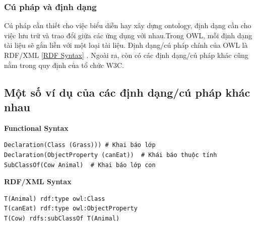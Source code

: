 \subsubsection{Cú pháp và định dạng}
Cú pháp cần thiết cho việc biểu diễn hay xây dựng ontology, định dạng cần cho việc lưu trữ và trao đổi giữa các ứng dụng với nhau.Trong OWL, mỗi định dạng tài liệu sẽ gắn liền với một loại tài liệu. Định dạng/cú pháp chính của OWL là RDF/XML [\href{http://www.w3.org/TR/owl2-overview/#ref-rdf-syntax}{RDF Syntax}] \cite{rdfxml}. Ngoài ra, còn có các định dạng/cú pháp khác cũng nằm trong quy định của tổ chức W3C.
\subsection{Một số ví dụ của các định dạng/cú pháp khác nhau}

\textbf{Functional Syntax}
\begin{verbatim}
Declaration(Class (Grass))) # Khai báo lớp
Declaration(ObjectProperty (canEat))  # Khái báo thuộc tính
SubClassOf(Cow Animal)  # Khai báo lớp con
\end{verbatim}

\textbf{RDF/XML Syntax}
\begin{verbatim}
T(Animal) rdf:type owl:Class
T(canEat) rdf:type owl:ObjectProperty
T(Cow) rdfs:subClassOf T(Animal) 
\end{verbatim}


